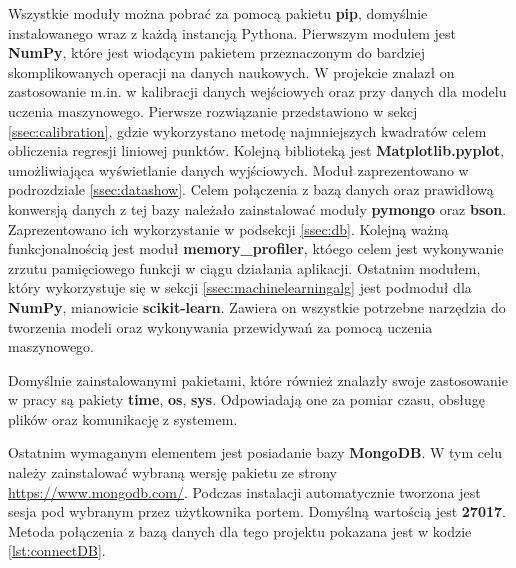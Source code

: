 Wszystkie moduły można pobrać za pomocą pakietu \textbf{pip}, domyślnie instalowanego wraz z każdą instancją Pythona. Pierwszym modułem jest \textbf{NumPy}, które jest wiodącym pakietem przeznaczonym do bardziej skomplikowanych operacji na danych naukowych. W projekcie znalazł on zastosowanie m.in. w kalibracji danych wejściowych oraz przy danych dla modelu uczenia maszynowego. Pierwsze rozwiązanie przedstawiono w sekcj \ref{ssec:calibration}, gdzie wykorzystano metodę najmniejszych kwadratów celem obliczenia regresji liniowej punktów. Kolejną biblioteką jest \textbf{Matplotlib.pyplot}, umożliwiająca wyświetlanie danych wyjściowych. Moduł zaprezentowano w podrozdziale \ref{ssec:datashow}. Celem połączenia z bazą danych oraz prawidłową konwersją danych z tej bazy należało zainstalować moduły \textbf{pymongo} oraz \textbf{bson}. Zaprezentowano ich wykorzystanie w podsekcji \ref{ssec:db}. Kolejną ważną funkcjonalnością jest moduł \textbf{memory\_profiler}, któego celem jest wykonywanie zrzutu pamięciowego funkcji w ciągu działania aplikacji. Ostatnim modułem, który wykorzystuje się w sekcji \ref{ssec:machinelearningalg} jest podmoduł dla \textbf{NumPy}, mianowicie \textbf{scikit-learn}. Zawiera on wszystkie potrzebne narzędzia do tworzenia modeli oraz wykonywania przewidywań za pomocą uczenia maszynowego.\par
Domyślnie zainstalowanymi pakietami, które również znalazły swoje zastosowanie w pracy są pakiety \textbf{time}, \textbf{os}, \textbf{sys}. Odpowiadają one za pomiar czasu, obsługę plików oraz komunikację z systemem.\par
Ostatnim wymaganym elementem jest posiadanie bazy \textbf{MongoDB}. W tym celu należy zainstalować wybraną wersję pakietu ze strony \url{https://www.mongodb.com/}. Podczas instalacji automatycznie tworzona jest sesja pod wybranym przez użytkownika portem. Domyślną wartością jest \textbf{27017}. Metoda połączenia z bazą danych dla tego projektu pokazana jest w kodzie \ref{lst:connectDB}.
